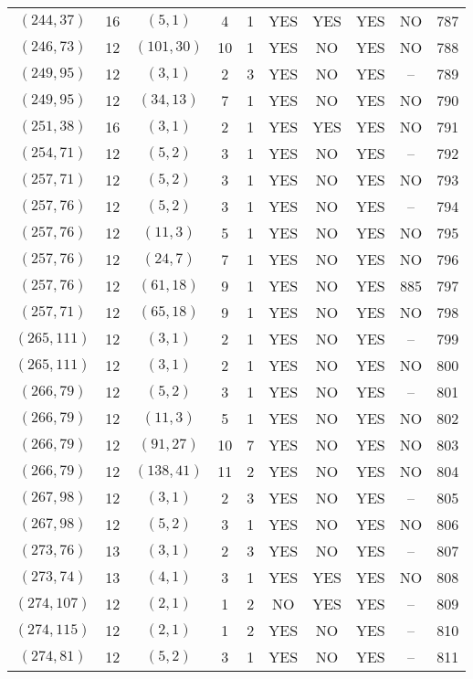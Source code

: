 \begin{longtable}{|c|c|c|c|c|c|c|c|c|c|}
$(244, 37)$ & 16 & $(5, 1)$ & 4 & 1 & YES & YES & YES & NO & 787\\
$(246, 73)$ & 12 & $(101, 30)$ & 10 & 1 & YES & NO & YES & NO & 788\\
$(249, 95)$ & 12 & $(3, 1)$ & 2 & 3 & YES & NO & YES & -- & 789\\
$(249, 95)$ & 12 & $(34, 13)$ & 7 & 1 & YES & NO & YES & NO & 790\\
$(251, 38)$ & 16 & $(3, 1)$ & 2 & 1 & YES & YES & YES & NO & 791\\
$(254, 71)$ & 12 & $(5, 2)$ & 3 & 1 & YES & NO & YES & -- & 792\\
$(257, 71)$ & 12 & $(5, 2)$ & 3 & 1 & YES & NO & YES & NO & 793\\
$(257, 76)$ & 12 & $(5, 2)$ & 3 & 1 & YES & NO & YES & -- & 794\\
$(257, 76)$ & 12 & $(11, 3)$ & 5 & 1 & YES & NO & YES & NO & 795\\
$(257, 76)$ & 12 & $(24, 7)$ & 7 & 1 & YES & NO & YES & NO & 796\\
$(257, 76)$ & 12 & $(61, 18)$ & 9 & 1 & YES & NO & YES & 885 & 797\\
$(257, 71)$ & 12 & $(65, 18)$ & 9 & 1 & YES & NO & YES & NO & 798\\
$(265, 111)$ & 12 & $(3, 1)$ & 2 & 1 & YES & NO & YES & -- & 799\\
$(265, 111)$ & 12 & $(3, 1)$ & 2 & 1 & YES & NO & YES & NO & 800\\
$(266, 79)$ & 12 & $(5, 2)$ & 3 & 1 & YES & NO & YES & -- & 801\\
$(266, 79)$ & 12 & $(11, 3)$ & 5 & 1 & YES & NO & YES & NO & 802\\
$(266, 79)$ & 12 & $(91, 27)$ & 10 & 7 & YES & NO & YES & NO & 803\\
$(266, 79)$ & 12 & $(138, 41)$ & 11 & 2 & YES & NO & YES & NO & 804\\
$(267, 98)$ & 12 & $(3, 1)$ & 2 & 3 & YES & NO & YES & -- & 805\\
$(267, 98)$ & 12 & $(5, 2)$ & 3 & 1 & YES & NO & YES & NO & 806\\
$(273, 76)$ & 13 & $(3, 1)$ & 2 & 3 & YES & NO & YES & -- & 807\\
$(273, 74)$ & 13 & $(4, 1)$ & 3 & 1 & YES & YES & YES & NO & 808\\
$(274, 107)$ & 12 & $(2, 1)$ & 1 & 2 & NO & YES & YES & -- & 809\\
$(274, 115)$ & 12 & $(2, 1)$ & 1 & 2 & YES & NO & YES & -- & 810\\
$(274, 81)$ & 12 & $(5, 2)$ & 3 & 1 & YES & NO & YES & -- & 811\\

\end{longtable}
